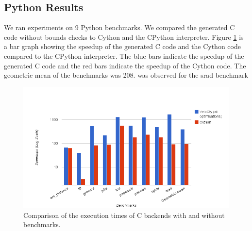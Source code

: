 \subsection{Python Results}
We ran experiments on 9 Python benchmarks. We compared the generated C code without bounds checks to Cython and the CPython interpreter. Figure \ref{fig:results_cwochecks_py} is a bar graph showing the speedup of the generated C code and the Cython code compared to the CPython interpreter. The blue bars indicate the speedup of the generated C code and the red bars indicate the speedup of the Cython code. The geometric mean of the benchmarks was 208. was observed for the srad benchmark 
\begin{figure}[htbp]
\centering
\includegraphics[scale=0.5]{Figures/results_cwochecks_py.png}
\caption{Comparison of the execution times of C backends with and without benchmarks. }
\label{fig:results_cwochecks_py}
\end{figure}
